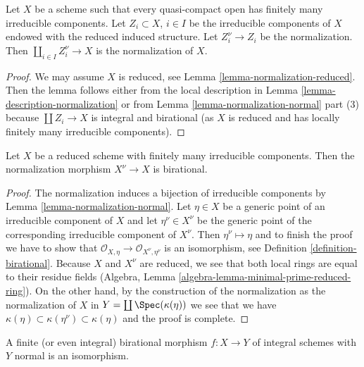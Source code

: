 \begin{lemma}
\label{lemma-normalization-in-terms-of-components}
Let $X$ be a scheme such that every quasi-compact open has
finitely many irreducible components. Let $Z_i \subset X$, $i \in I$
be the irreducible components of $X$ endowed with the reduced
induced structure. Let $Z_i^\nu \to Z_i$ be the normalization.
Then $\coprod_{i \in I} Z_i^\nu \to X$ is the normalization of $X$.
\end{lemma}

\begin{proof}
We may assume $X$ is reduced, see Lemma \ref{lemma-normalization-reduced}.
Then the lemma follows either from the local description in
Lemma \ref{lemma-description-normalization}
or from Lemma \ref{lemma-normalization-normal} part (3) because
$\coprod Z_i \to X$ is integral and birational (as $X$ is reduced
and has locally finitely many irreducible components).
\end{proof}

\begin{lemma}
\label{lemma-normalization-birational}
Let $X$ be a reduced scheme with finitely many irreducible components.
Then the normalization morphism $X^\nu \to X$ is birational.
\end{lemma}

\begin{proof}
The normalization induces a bijection of irreducible components by
Lemma \ref{lemma-normalization-normal}. Let $\eta \in X$ be a generic
point of an irreducible component of $X$ and let $\eta^\nu \in X^\nu$
be the generic point of the corresponding irreducible component of $X^\nu$.
Then $\eta^\nu \mapsto \eta$ and to finish the proof we have to show that
$\mathcal{O}_{X, \eta} \to \mathcal{O}_{X^\nu, \eta^\nu}$
is an isomorphism, see Definition \ref{definition-birational}.
Because $X$ and $X^\nu$ are reduced, we see that both local rings
are equal to their residue fields
(Algebra, Lemma \ref{algebra-lemma-minimal-prime-reduced-ring}).
On the other hand, by the construction of the normalization
as the normalization of $X$ in $Y = \coprod \Spec(\kappa(\eta))$
we see that we have
$\kappa(\eta) \subset \kappa(\eta^\nu) \subset \kappa(\eta)$
and the proof is complete.
\end{proof}

\begin{lemma}
\label{lemma-finite-birational-over-normal}
A finite (or even integral) birational morphism $f : X \to Y$
of integral schemes with $Y$ normal is an isomorphism.
\end{lemma}

